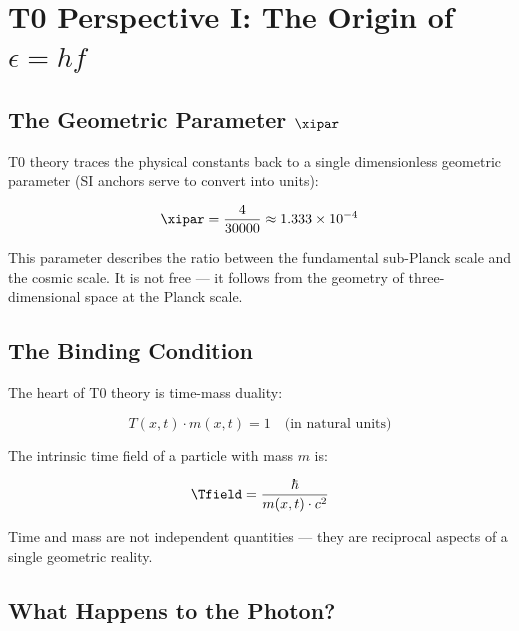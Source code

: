 \clearpage

\section{T0 Perspective I: The Origin of $\epsilon = hf$}
\label{sec:t0_quantization}

\subsection{The Geometric Parameter $\xipar$}

T0 theory traces the physical constants back to a single dimensionless 
geometric parameter (SI anchors serve to convert into units):

\begin{equation}
    \xipar = \frac{4}{30000} \approx 1.333 \times 10^{-4}
    \label{eq:xi_definition}
\end{equation}

This parameter describes the ratio between the fundamental sub-Planck scale and the 
cosmic scale. It is not free — it follows from the geometry of three-dimensional 
space at the Planck scale.

\subsection{The Binding Condition}

The heart of T0 theory is time-mass duality:

\begin{equation}
    T(x,t) \cdot m(x,t) = 1 \quad \text{(in natural units)}
    \label{eq:t0_constraint}
\end{equation}

The intrinsic time field of a particle with mass $m$ is:

\begin{equation}
    \Tfield = \frac{\hbar}{m(x,t) \cdot c^2}
    \label{eq:timefield}
\end{equation}

Time and mass are not independent quantities — they are reciprocal aspects of a 
single geometric reality.

\subsection{What Happens to the Photon?}

